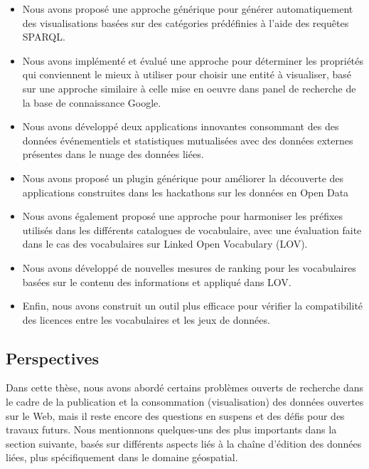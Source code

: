 \begin{itemize}
 \item Nous avons propos\'{e} une approche g\'{e}n\'{e}rique pour g\'{e}n\'{e}rer automatiquement des visualisations bas\'{e}es sur des cat\'{e}gories pr\'{e}d\'{e}finies \`{a} l'aide des requ\^{e}tes SPARQL.
 \item Nous avons impl\'{e}ment\'{e} et \'{e}valu\'{e} une approche pour d\'{e}terminer les propri\'{e}t\'{e}s qui conviennent le mieux \`{a} utiliser pour choisir une entit\'{e} \`{a} visualiser, bas\'{e} sur une approche similaire \`{a} celle mise en oeuvre dans panel de recherche de la base de connaissance Google.
 \item Nous avons d\'{e}velopp\'{e} deux applications innovantes consommant des des donn\'{e}es \'{e}v\'{e}nementiels et statistiques mutualis\'{e}es avec des donn\'{e}es externes pr\'{e}sentes dans le nuage des donn\'{e}es li\'{e}es.
 \item Nous avons propos\'{e} un plugin g\'{e}n\'{e}rique pour am\'{e}liorer la d\'{e}couverte des applications construites dans les hackathons sur les donn\'{e}es en Open Data
 \item Nous avons \'{e}galement propos\'{e} une approche pour harmoniser les pr\'{e}fixes utilis\'{e}s dans les diff\'{e}rents catalogues de vocabulaire, avec une \'{e}valuation faite dans le cas des vocabulaires  sur Linked Open Vocabulary (LOV).
 \item Nous avons d\'{e}velopp\'{e} de nouvelles mesures de ranking pour les vocabulaires bas\'{e}es sur le contenu des informations et appliqu\'{e} dans LOV.
 \item Enfin, nous avons construit un outil plus efficace pour v\'{e}rifier la compatibilit\'{e} des licences entre les vocabulaires et les jeux de donn\'{e}es.
\end{itemize}

\subsection*{Perspectives}
\label{sec:future}
Dans cette th\`{e}se, nous avons abord\'{e} certains probl\`{e}mes ouverts de recherche dans le cadre de la publication et la consommation (visualisation) des donn\'{e}es ouvertes sur le Web, mais il reste encore des questions en suspens et des d\'{e}fis pour des travaux futurs. Nous mentionnons quelques-uns des plus importants dans la section suivante, bas\'{e}s sur diff\'{e}rents aspects li\'{e}s \`{a} la chaîne d'\'{e}dition des donn\'{e}es li\'{e}es, plus sp\'{e}cifiquement dans le domaine g\'{e}ospatial.

